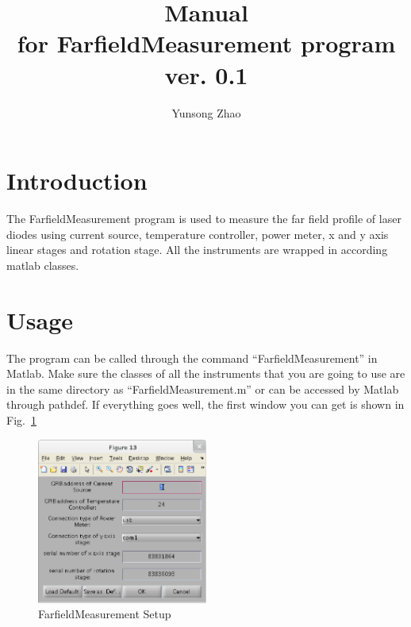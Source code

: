 \documentclass[a4paper,12pt]{article}
\title{Manual\\ \large for FarfieldMeasurement program\\ ver. 0.1}
\author{Yunsong Zhao}
\date{}
\begin{document}
\maketitle
\section{Introduction}
The FarfieldMeasurement program is used to measure the far field profile of
laser diodes using current source, temperature controller, power meter, x and y
axis linear stages and rotation stage. All the instruments are wrapped in
according matlab classes. 

\section{Usage}
The program can be called through the command ``FarfieldMeasurement'' in Matlab. Make
sure the classes of all the instruments that you are going to use are in the
same directory as ``FarfieldMeasurement.m'' or can be accessed by Matlab through
pathdef. If everything goes well, the first window you can get is shown in
Fig.~\ref{fig:setup}
\begin{figure}[htbp]
	\centering
	\includegraphics[width=0.5\textwidth]{./figs/setup.eps}
	\caption{FarfieldMeasurement Setup}
	\label{fig:setup}
\end{figure}
\end{document}
